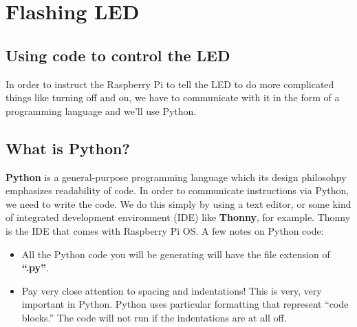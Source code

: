 \documentclass{article}\usepackage[]{graphicx}\usepackage[]{color}
\begin{document}
\section{Flashing LED}

\subsection{Using code to control the LED}

In order to instruct the Raspberry Pi to tell the LED to do more complicated things like turning off and on, we have to communicate with it in the form of a programming language and we'll use Python.

\subsection{What is Python?}

\textbf{Python} is a general-purpose programming language which its design philosohpy emphasizes readability of code.
\newline
\newline
In order to communicate instructions via Python, we need to write the code. We do this simply by using a text editor, or some kind of integrated development environment (IDE) like \textbf{Thonny}, for example. Thonny is the IDE that comes with Raspberry Pi OS.
\newline
\newline
A few notes on Python code:

\begin{itemize}
\item All the Python code you will be generating will have the file extension of \textbf{``.py''}.
\item Pay very close attention to spacing and indentations! This is very, very important in Python. Python uses particular formatting that represent ``code blocks.'' The code will not run if the indentations are at all off.
\end{itemize}
\end{document}
